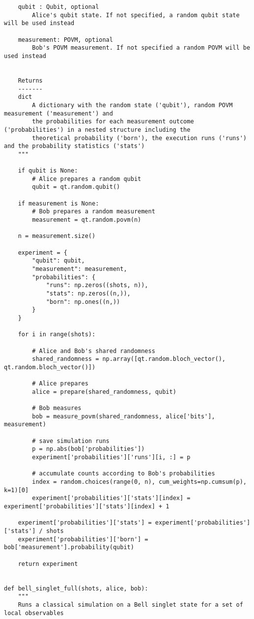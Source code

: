 \begin{verbatim}
    qubit : Qubit, optional
        Alice's qubit state. If not specified, a random qubit state will be used instead

    measurement: POVM, optional
        Bob's POVM measurement. If not specified a random POVM will be used instead


    Returns
    -------
    dict
        A dictionary with the random state ('qubit'), random POVM measurement ('measurement') and
        the probabilities for each measurement outcome ('probabilities') in a nested structure including the
        theoretical probability ('born'), the execution runs ('runs') and the probability statistics ('stats')
    """

    if qubit is None:
        # Alice prepares a random qubit
        qubit = qt.random.qubit()

    if measurement is None:
        # Bob prepares a random measurement
        measurement = qt.random.povm(n)

    n = measurement.size()

    experiment = {
        "qubit": qubit,
        "measurement": measurement,
        "probabilities": {
            "runs": np.zeros((shots, n)),
            "stats": np.zeros((n,)),
            "born": np.ones((n,))
        }
    }

    for i in range(shots):

        # Alice and Bob's shared randomness
        shared_randomness = np.array([qt.random.bloch_vector(), qt.random.bloch_vector()])

        # Alice prepares
        alice = prepare(shared_randomness, qubit)

        # Bob measures
        bob = measure_povm(shared_randomness, alice['bits'], measurement)

        # save simulation runs
        p = np.abs(bob['probabilities'])
        experiment['probabilities']['runs'][i, :] = p

        # accumulate counts according to Bob's probabilities
        index = random.choices(range(0, n), cum_weights=np.cumsum(p), k=1)[0]
        experiment['probabilities']['stats'][index] = experiment['probabilities']['stats'][index] + 1

    experiment['probabilities']['stats'] = experiment['probabilities']['stats'] / shots
    experiment['probabilities']['born'] = bob['measurement'].probability(qubit)

    return experiment


def bell_singlet_full(shots, alice, bob):
    """
    Runs a classical simulation on a Bell singlet state for a set of local observables


\end{verbatim}
